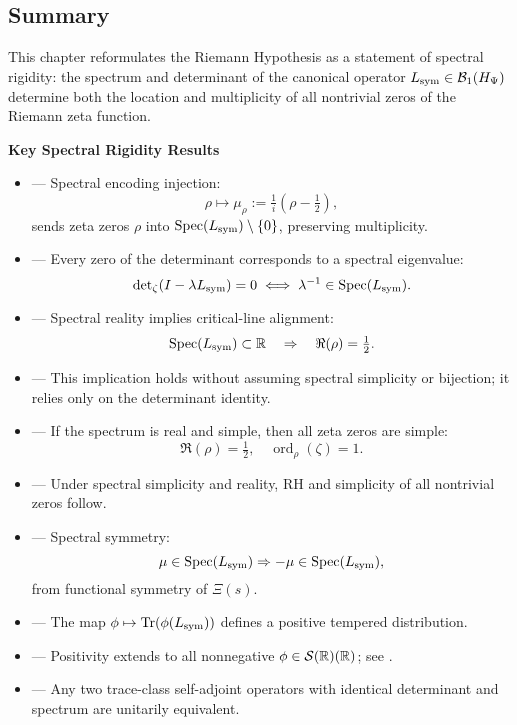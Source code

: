 \subsection*{Summary}

This chapter reformulates the Riemann Hypothesis as a statement of spectral rigidity: the spectrum and determinant of the canonical operator \( L_{\mathrm{sym}} \in \mathcal{B}_1(H_{\Psi}) \) determine both the location and multiplicity of all nontrivial zeros of the Riemann zeta function.

\textbf{Key Spectral Rigidity Results}
\begin{itemize}
  \item {} — Spectral encoding injection:
  \[
  \rho \mapsto \mu_\rho := \tfrac{1}{i}(\rho - \tfrac{1}{2}),
  \]
  sends zeta zeros \( \rho \) into \( \operatorname{Spec}(L_{\mathrm{sym}}) \setminus \{0\} \), preserving multiplicity.

  \item {} — Every zero of the determinant corresponds to a spectral eigenvalue:
  \[
  \det\nolimits_{\zeta}(I - \lambda L_{\mathrm{sym}}) = 0 \iff \lambda^{-1} \in \operatorname{Spec}(L_{\mathrm{sym}}).
  \]

  \item {} — Spectral reality implies critical-line alignment:
  \[
  \operatorname{Spec}(L_{\mathrm{sym}}) \subset \mathbb{R} \quad \Rightarrow \quad \Re(\rho) = \tfrac{1}{2}.
  \]

  \item {} — This implication holds without assuming spectral simplicity or bijection; it relies only on the determinant identity.

  \item {} — If the spectrum is real and simple, then all zeta zeros are simple:
  \[
  \Re(\rho) = \tfrac{1}{2}, \quad \operatorname{ord}_\rho(\zeta) = 1.
  \]

  \item {} — Under spectral simplicity and reality, RH and simplicity of all nontrivial zeros follow.

  \item {} — Spectral symmetry:
  \[
  \mu \in \operatorname{Spec}(L_{\mathrm{sym}}) \Rightarrow -\mu \in \operatorname{Spec}(L_{\mathrm{sym}}),
  \]
  from functional symmetry of \( \Xi(s) \).

  \item {} — The map \( \phi \mapsto \operatorname{Tr}(\phi(L_{\mathrm{sym}})) \) defines a positive tempered distribution.

  \item {} — Positivity extends to all nonnegative \( \phi \in \mathcal{S}(\mathbb{R})(\mathbb{R}) \); see .

  \item {} — Any two trace-class self-adjoint operators with identical determinant and spectrum are unitarily equivalent.
\end{itemize}

